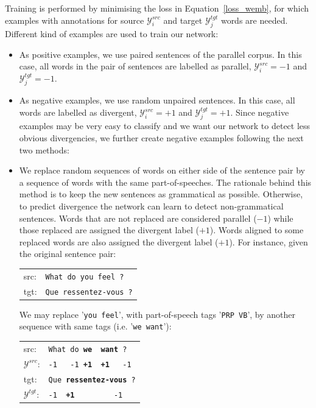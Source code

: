 \documentclass[11pt,a4paper]{article}
\begin{document}
Training is performed by minimising the loss in Equation~\eqref{loss_wemb}, for which examples with annotations for source $\mathcal{Y}_i^{src}$ and target $\mathcal{Y}_j^{tgt}$ words are needed.
Different kind of examples are used to train our network:
\begin{itemize}

\item As positive examples, we use paired sentences of the parallel corpus. In this case, all words in the pair of sentences are labelled as parallel, $\mathcal{Y}_i^{src}=-1$ and $\mathcal{Y}_j^{tgt}=-1$. 

\item As negative examples, we use random unpaired sentences. In this case, all words are labelled as divergent, $\mathcal{Y}_i^{src}=+1$ and $\mathcal{Y}_j^{tgt}=+1$. 
Since negative examples may be very easy to classify and we want our network to detect less obvious divergencies, we further create negative examples following the next two methods:

\item We replace random sequences of words on either side of the sentence pair by a sequence of words with the same part-of-speeches. 
The rationale behind this method is to keep the new sentences as grammatical as possible. 
Otherwise, to predict divergence the network can learn to detect non-grammatical sentences.
Words that are not replaced are considered parallel ($-1$) while those replaced are assigned the divergent label ($+1$). 
Words aligned to some replaced words are also assigned the divergent label ($+1$). For instance, given the original sentence pair:

\begin{table}[h]
\center
\begin{tabular}{ll}
src: & { \small \texttt{What do you feel ?}} \\
tgt: & { \small \texttt{Que ressentez-vous ?}} \\
\end{tabular}
\end{table}

We may replace '\texttt{you feel}', with part-of-speech tags '\texttt{PRP VB}', by another sequence with same tags (i.e. '\texttt{we want}'):

\begin{table}[h]
\center
\begin{tabular}{ll}
src: & { \small \texttt{What do {\bf we \ want} ?}} \\
$\mathcal{Y}^{src}$: & { \small \texttt{-1 \ \  -1 {\bf +1\ \ +1} \ \  -1}} \\
tgt: & { \small \texttt{Que {\bf ressentez-vous} ?}} \\
$\mathcal{Y}^{tgt}$: & { \small \texttt{-1\ \ {\bf +1}\ \ \ \ \ \ \ \ \ -1}} \\
\end{tabular}
\end{table}


\end{itemize}
\end{document}
